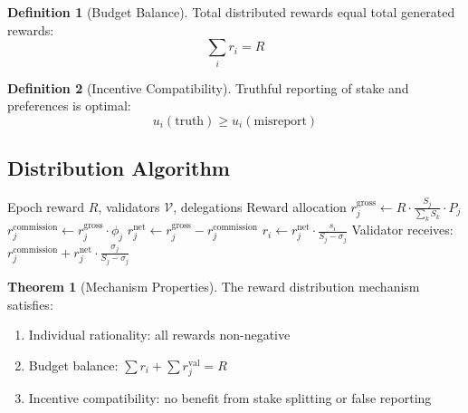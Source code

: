 \documentclass[11pt,a4paper]{article}
\theoremstyle{definition}
\newtheorem{definition}{Definition}[section]
\newtheorem{theorem}{Theorem}[section]
\theoremstyle{remark}
\begin{document}
\begin{definition}[Budget Balance]
Total distributed rewards equal total generated rewards:
\begin{equation}
    \sum_i r_i = R
\end{equation}
\end{definition}

\begin{definition}[Incentive Compatibility]
Truthful reporting of stake and preferences is optimal:
\begin{equation}
    u_i(\text{truth}) \geq u_i(\text{misreport})
\end{equation}
\end{definition}

\subsection{Distribution Algorithm}

\begin{algorithm}
\caption{Reward Distribution}
\begin{algorithmic}[1]
\Require Epoch reward $R$, validators $\mathcal{V}$, delegations
\Ensure Reward allocation
    \State $r_j^{\text{gross}} \gets R \cdot \frac{S_j}{\sum_k S_k} \cdot P_j$
    \State $r_j^{\text{commission}} \gets r_j^{\text{gross}} \cdot \phi_j$
    \State $r_j^{\text{net}} \gets r_j^{\text{gross}} - r_j^{\text{commission}}$
        \State $r_i \gets r_j^{\text{net}} \cdot \frac{s_i}{S_j - \sigma_j}$
    \EndFor
    \State Validator receives: $r_j^{\text{commission}} + r_j^{\text{net}} \cdot \frac{\sigma_j}{S_j - \sigma_j}$
\EndFor
\end{algorithmic}
\end{algorithm}

\begin{theorem}[Mechanism Properties]
The reward distribution mechanism satisfies:
\begin{enumerate}
    \item Individual rationality: all rewards non-negative
    \item Budget balance: $\sum r_i + \sum r_j^{\text{val}} = R$
    \item Incentive compatibility: no benefit from stake splitting or false reporting
\end{enumerate}
\end{theorem}
\end{document}
